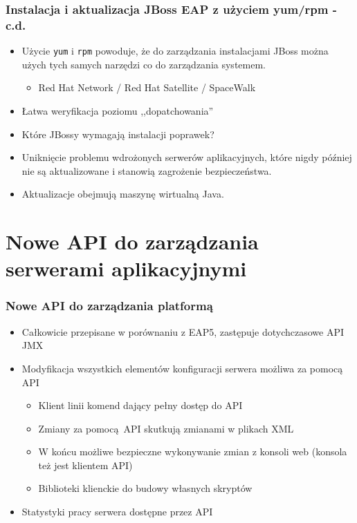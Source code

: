 \documentclass[dvipsnames,table]{beamer}
\begin{document}
\begin{frame}
\frametitle{Instalacja i aktualizacja JBoss EAP z użyciem yum/rpm - c.d.}
\begin{itemize}
	\item Użycie {\tt yum} i {\tt rpm} powoduje, że do zarządzania instalacjami JBoss można użych tych samych narzędzi co do zarządzania systemem.
	\begin{itemize}
		\item Red Hat Network / Red Hat Satellite / SpaceWalk
	\end{itemize}
	\item Łatwa weryfikacja poziomu ,,dopatchowania''
	\item Które JBossy wymagają instalacji poprawek?
	\item Uniknięcie problemu wdrożonych serwerów aplikacyjnych, które nigdy później nie są aktualizowane i stanowią zagrożenie bezpieczeństwa.
	\item Aktualizacje obejmują maszynę wirtualną Java.
\end{itemize}
\end{frame}

\section{Nowe API do zarządzania serwerami aplikacyjnymi}

\begin{frame}
\frametitle{Nowe API do zarządzania platformą}
\begin{itemize}
	\item Całkowicie przepisane w porównaniu z EAP5, zastępuje dotychczasowe API JMX
	\item Modyfikacja wszystkich elementów konfiguracji serwera możliwa za pomocą API
	\begin{itemize}
		\item Klient linii komend dający pełny dostęp do API
		\item Zmiany za pomocą API skutkują zmianami w plikach XML
		\item W końcu możliwe bezpieczne wykonywanie zmian z konsoli web (konsola też jest klientem API)
		\item Biblioteki klienckie do budowy własnych skryptów
	\end{itemize}
	\item Statystyki pracy serwera dostępne przez API
\end{itemize}
\end{frame}
\end{document}
